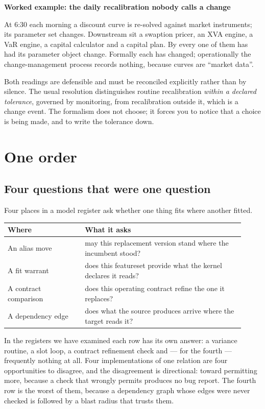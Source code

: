\documentclass[11pt,a4paper]{article}
\renewcommand{\_}{\oldunderscore\allowbreak}
\theoremstyle{plain}
\theoremstyle{definition}
\theoremstyle{definition}
\theoremstyle{remark}
\newcommand{\wk}[1]{\textbf{Worked example: #1}\par\smallskip}
\begin{document}
\begin{worked}
\wk{the daily recalibration nobody calls a change}
At 6:30 each morning a discount curve is re-solved against market instruments; its parameter set
changes. Downstream sit a swaption pricer, an XVA engine, a VaR engine, a capital calculator and a
capital plan. By  every one of them has had its parameter object change. Formally each
has changed; operationally the change-management process records nothing, because curves are ``market
data''.

Both readings are defensible and must be reconciled explicitly rather than by silence. The usual
resolution distinguishes routine recalibration \emph{within a declared tolerance}, governed by
monitoring, from recalibration outside it, which is a change event. The formalism does not choose; it
forces you to notice that a choice is being made, and to write the tolerance down.
\end{worked}

\section{One order}\label{sec:order}

\subsection{Four questions that were one question}

Four places in a model register ask whether one thing fits where another fitted.

\begin{center}
\small
\begin{tabular}{@{}p{0.30\linewidth}p{0.62\linewidth}@{}}
\toprule
\textbf{Where} & \textbf{What it asks} \\
\midrule
An alias move            & may this replacement version stand where the incumbent stood? \\
A fit warrant            & does this featureset provide what the kernel declares it reads? \\
A contract comparison    & does this operating contract refine the one it replaces? \\
A dependency edge        & does what the source produces arrive where the target reads it? \\
\bottomrule
\end{tabular}
\end{center}

In the registers we have examined each row has its own answer: a variance routine, a slot loop, a
contract refinement check and --- for the fourth --- frequently nothing at all. Four implementations of
one relation are four opportunities to disagree, and the disagreement is directional: toward permitting
more, because a check that wrongly permits produces no bug report. The fourth row is the worst of them,
because a dependency graph whose edges were never checked is followed by a blast radius that trusts them.
\end{document}
